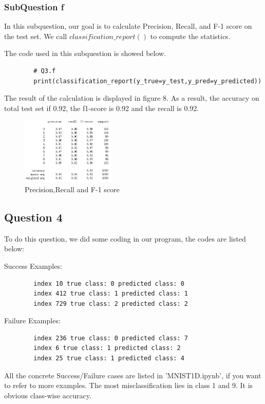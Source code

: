 \documentclass[conference]{IEEEtran}
\begin{document}
	\subsubsection{SubQuestion f}
	In this subquestion, our goal is to calculate Precision, Recall, and F-1 score on the test set. We call $classification\_report()$ to compute the statistics. \par
	
	The code used in this subquestion is showed below. \par
	
	
	
	\begin{lstlisting}
		# Q3.f
		print(classification_report(y_true=y_test,y_pred=y_predicted))
	\end{lstlisting} \par
	The result of the calculation is displayed in figure 8. As a result, the accuracy on total test set if 0.92, the f1-score is 0.92 and the recall is 0.92.
	\begin{figure}[h] 
		\centering
		\includegraphics[width=0.4\textwidth]{T1Q3f.png}
		\caption{Precision,Recall and F-1 score}
		\label{Fig.t1q3f}
	\end{figure}
	\subsection{Question 4}
	To do this question, we did some coding in our program, the codes are listed below:
	
	Success Examples:
	\begin{lstlisting}
		index 10 true class: 0 predicted class: 0
		index 412 true class: 1 predicted class: 1
		index 729 true class: 2 predicted class: 2
	\end{lstlisting}
	Failure Examples:
	\begin{lstlisting}
		index 236 true class: 0 predicted class: 7
		index 6 true class: 1 predicted class: 2
		index 25 true class: 1 predicted class: 4
	\end{lstlisting}
	
	All the concrete Success/Failure cases are listed in 'MNIST1D.ipynb', if you want to refer to more examples.
	The most misclassification lies in class 1 and 9. It is obvious class-wise accuracy.
\end{document}
